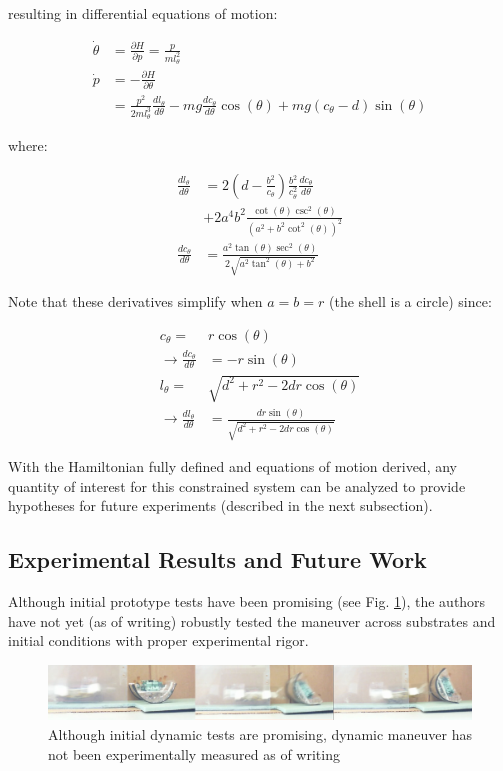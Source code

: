 \documentclass[letterpaper, 10 pt, conference]{ieeeconf}
\begin{document}
resulting in differential equations of motion:

\begin{align}
  \dot{\theta} &=  \frac{\partial H}{\partial p} = \frac{p}{ml_\theta^2} \\
  \dot{p} &= - \frac{\partial H}{\partial \theta} \nonumber \\
  &= \frac{p^2}{2 m l_\theta^3} \frac{dl_\theta}{d\theta} - mg \frac{dc_\theta}{d\theta} \cos(\theta) + mg (c_\theta - d) \sin(\theta)
\end{align}

where:

\begin{align}
  \frac{d l_\theta}{d\theta} &= 2 \left(d - \frac{b^2}{c_\theta} \right) \frac{b^2}{c_\theta^2} \frac{d c_\theta}{d\theta} \nonumber \\
  &  + 2a^4 b^2 \frac{\cot(\theta) \csc^2(\theta)}{(a^2 + b^2 \cot^2(\theta))^2} \\
  \frac{d c_\theta}{d\theta} &= \frac{a^2 \tan(\theta) \sec^2(\theta)}{2 \sqrt{a^2 \tan^2(\theta) + b^2}}
\end{align}

Note that these derivatives simplify when $a = b = r$ (the shell is a circle) since:

\begin{align}
  c_\theta = & r \cos(\theta) \\
  \rightarrow \frac{d c_\theta}{d\theta} &= -r \sin(\theta)\\
  l_\theta = & \sqrt{d^2 + r^2 - 2 d r \cos(\theta)} \\
  \rightarrow \frac{d l_\theta}{d\theta} &= \frac{d r \sin(\theta)}{ \sqrt{d^2 + r^2 - 2 d r \cos(\theta)} }
\end{align}

With the Hamiltonian fully defined and equations of motion derived, any quantity of interest for this constrained system can be analyzed to provide hypotheses for future experiments (described in the next subsection).

\subsection{Experimental Results and Future Work}
Although initial prototype tests have been promising (see Fig. \ref{fig:DynamicFlipRealLife}), the authors have not yet (as of writing) robustly tested the maneuver across substrates and initial conditions with proper experimental rigor.

\begin{figure}[ht]
  \centering
  \includegraphics[width=0.9\columnwidth]{DynamicPromiseStrip.jpg}
  \caption{\label{fig:DynamicFlipRealLife}Although initial dynamic tests are promising, dynamic maneuver has not been experimentally measured as of writing}
\end{figure}
\end{document}
